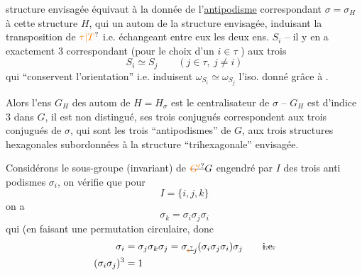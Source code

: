 structure envisagée équivaut à la donnée de l'\uline{antipodisme} correspondant $\sigma=\sigma_H$ à cette structure $H$, qui   un autom  de la structure envisagée, induisant la transposition de $\unsure{\tau|T}$ i.e. échangeant entre eux les deux ens. $S_i$
-- il y en a exactement $3$ correspondant (pour le choix d'un $i\in\tau$ ) aux trois 
\[
S_i\simeq S_j\qquad(j\in\tau,\ j\ne i)
\]
qui ``conservent l'orientation''\unsure{)} i.e. induisent $\omega_{S_i}\simeq\omega_{S_j}$ l'iso. donné grâce à . 

Alors l'ens $G_H$ des autom de $H=H_\sigma$ est le centralisateur de $\sigma$ -- $G_H$ est d'indice $3$ dans $G$, il est non distingué, ses trois conjugués correspondent aux trois conjugués de $\sigma$, qui sont les trois ``antipodismes'' de $G$,  aux trois structures hexagonales subordonnées à la structure ``trihexagonale'' envisagée.

Considérons le sous-groupe (invariant)  de $\deleted{\unsure{G'}}G$ engendré par  $I$ des trois anti%
%
podismes $\sigma_i$, on vérifie que pour
\[
I=\{i,j,k\}
\]
on a
\[
\sigma_k=\sigma_i\sigma_j\sigma_i
\]
 qui   (en faisant une permutation circulaire, donc
\[
\begin{aligned}
\sigma_i&=\sigma_j\sigma_k\sigma_j
=\sigma_{\deleted{\unsure{i}}j}(\sigma_i\sigma_j\sigma_i)\sigma_j
\qquad\deleted{\text{i.e.}}\\
(\sigma_i\sigma_j)^3&=1
\end{aligned}
\]

